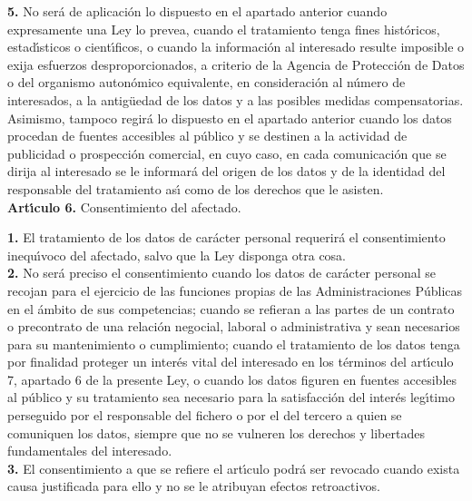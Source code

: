 {\bf 5.} No ser\'a de aplicaci\'on lo dispuesto en el apartado anterior cuando 
expresamente una Ley lo prevea, cuando el tratamiento tenga fines hist\'oricos,
estad\'{\i}sticos o cient\'{\i}ficos, o cuando la informaci\'on al interesado 
resulte imposible o exija esfuerzos desproporcionados, a criterio de la Agencia 
de Protecci\'on de Datos o del organismo auton\'omico equivalente, en 
consideraci\'on al n\'umero de interesados, a la antig\"uedad de los datos y a 
las posibles medidas compensatorias.\\
Asimismo, tampoco regir\'a lo dispuesto en el apartado anterior cuando los 
datos procedan de fuentes accesibles al p\'ublico y se destinen a la actividad 
de publicidad o prospecci\'on comercial, en cuyo caso, en cada comunicaci\'on 
que se dirija al interesado se le informar\'a del origen de los datos y de la 
identidad del responsable del tratamiento as\'{\i} como de los derechos que le 
asisten.
\vspace{0.3cm}\\
{\large {\bf Art\'{\i}culo 6.} Consentimiento del afectado.}

{\bf 1.} El tratamiento de los datos de car\'acter personal requerir\'a el 
consentimiento inequ\'{\i}voco del afectado, salvo que la Ley disponga otra 
cosa.\\

{\bf 2.} No ser\'a preciso el consentimiento cuando los datos de car\'acter 
personal se recojan para el ejercicio de las funciones propias de las 
Administraciones P\'ublicas en el \'ambito de sus competencias; cuando se 
refieran a las partes de un contrato o precontrato de una relaci\'on negocial,
laboral o administrativa y sean necesarios para su mantenimiento o 
cumplimiento; cuando el tratamiento de los datos tenga por finalidad proteger 
un inter\'es vital del interesado en los t\'erminos del art\'{\i}culo 7, 
apartado 6 de la presente Ley, o cuando los datos figuren en fuentes accesibles 
al p\'ublico y su tratamiento sea necesario para la satisfacci\'on del 
inter\'es leg\'{\i}timo perseguido por el responsable del fichero o por el del 
tercero a quien se comuniquen los datos, siempre que no se vulneren los 
derechos y libertades fundamentales del interesado.\\

{\bf 3.} El consentimiento a que se refiere el art\'{\i}culo podr\'a ser 
revocado cuando exista causa justificada para ello y no se le atribuyan efectos 
retroactivos.\\

